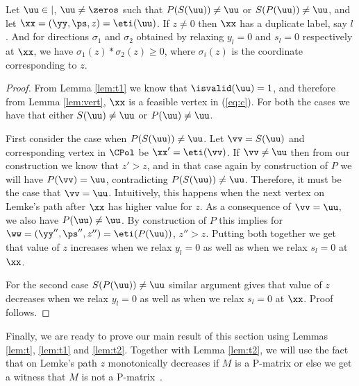 \begin{lemma}\label{lem:t2}
Let $\uu \in \vert$, $\uu \neq \zeros$ such that $P(S(\uu))\neq \uu$ or $S(P(\uu))\neq \uu$, and let $\xx=(\yy,\ps,z)=\eti(\uu)$. 
If $z\neq 0$ then $\xx$ has a duplicate label, say $l$. And for directions $\sigma_1$ and $\sigma_2$ obtained by relaxing $y_l=0$ and $s_l=0$ respectively at $\xx$, we have $\sigma_1(z)*\sigma_2(z)\ge 0$, where $\sigma_i(z)$ is the coordinate corresponding to $z$. 
\end{lemma}
\begin{proof}
From Lemma \ref{lem:t1} we know that $\isvalid(\uu)=1$, and therefore from Lemma \ref{lem:vert}, $\xx$ is a feasible vertex in (\ref{eq:c}). For both the cases we have that either $S(\uu)\neq \uu$ or $P(\uu)\neq \uu$. 

First consider the case when $P(S(\uu))\neq \uu$. Let $\vv=S(\uu)$ and corresponding vertex in $\CPol$ be $\xx'=\eti(\vv)$. 
If $\vv\neq \uu$ then from our construction we know that $z'>z$, and in that
case again by construction of $P$ we will have $P(\vv)=\uu$, contradicting
$P(S(\uu))\neq \uu$. Therefore, it must be the case that $\vv=\uu$.
Intuitively, this happens when the next vertex on Lemke's path after $\xx$ has
higher value for $z$. As a consequence of $\vv=\uu$, we also have $P(\uu)\neq \uu$. By construction of $P$ this implies for 
$\ww=(\yy'',\ps'',z'')=\eti(P(\uu))$, $z''>z$. Putting both together we get that value
of $z$ increases when we relax $y_l=0$ as well as when we relax $s_l=0$ at
$\xx$. 

For the second case $S(P(\uu))\neq \uu$ similar argument gives that value of $z$ decreases when we relax $y_l=0$ as well as when we relax $s_l=0$ at
$\xx$. Proof follows.
\end{proof}


Finally, we are ready to prove our main result of this section using Lemmas \ref{lem:t}, \ref{lem:t1} and \ref{lem:t2}. Together with Lemma \ref{lem:t2}, we will use the fact that on Lemke's path $z$ monotonically decreases if $M$ is a P-matrix or else we get a witness that $M$ is not a P-matrix~\cite{cottle2009linear}. 

